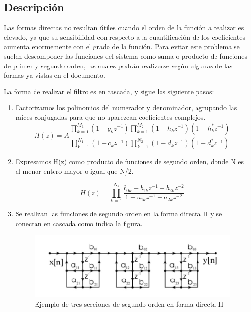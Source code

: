 \documentclass[titlepage]{article}
\begin{document}
\subsection{Descripción}
Las formas directas no resultan útiles cuando el orden de la función a realizar es elevado, ya que su sensibilidad con respecto a la cuantificación de los coeficientes aumenta enormemente con el grado de la función. Para evitar este problema se suelen descomponer las funciones del sistema como suma o producto de funciones de primer y segundo orden, las cuales podrán realizarse según algunas de las formas ya vistas en el documento.

La forma de realizar el filtro es en cascada, y sigue los siguiente pasos:
\begin{enumerate}
\item Factorizamos los polinomios del numerador y denominador, agrupando las raíces conjugadas para que no aparezcan coeficientes complejos.
\begin{equation}
H(z)=A\frac{\prod_{k=1}^{M_{1}}(1-g_kz^{-1})\prod_{k=1}^{M_{2}}(1-h_kz^{-1})(1-h_k^*z^{-1})}{\prod_{k=1}^{N_{1}}(1-c_kz^{-1})\prod_{k=1}^{N_{2}}(1-d_kz^{-1})(1-d_k^*z^{-1})}
\end{equation}

\item  Expresamos H(z) como producto de funciones de segundo orden, donde N es el menor
entero mayor o igual que N/2. 

\begin{equation}
H(z)=\prod_{k=1}^{N_s}\frac{b_{0k}+b_{1k}z^{-1}+b_{2k}z^{-2}}{1-a_{1k}z^{-1}-a_{2k}z^{-2}}
\end{equation}

\item  Se realizan las funciones  de segundo orden en la forma directa II y se conectan en cascada como indica la figura.
\begin{figure}[H]
  \centering
	\includegraphics[scale=0.5]{forma_directa_II}
  \caption{Ejemplo de tres secciones de segundo orden en forma directa II}
  \label{fig:forma_directa_II}
\end{figure}
\end{enumerate}
\end{document}
